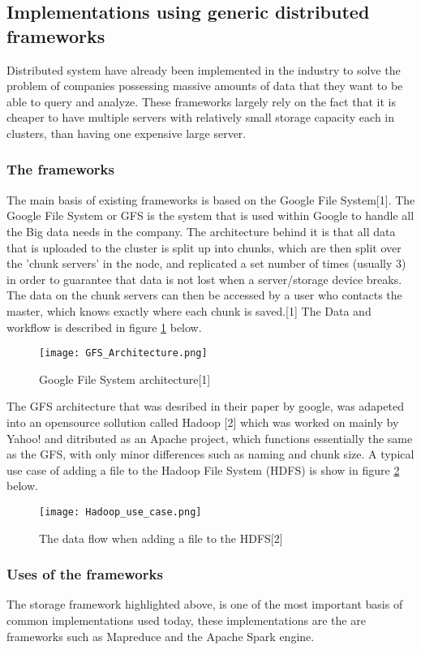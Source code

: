 \subsection{Implementations using generic distributed frameworks}
Distributed system have already been implemented in the industry to solve the
problem of companies possessing massive amounts of data that they want to be able
to query and analyze. These frameworks largely rely on the fact that it is cheaper
to have multiple servers with relatively small storage capacity each in clusters,
than having one expensive large server.

\subsubsection{The frameworks}
The main basis of existing frameworks is based on the Google File System[1]. The
Google File System or GFS is the system that is used within Google to handle all
the Big data needs in the company. The architecture behind it is that all data that
is uploaded to the cluster is split up into chunks, which are then split over the
'chunk servers' in the node, and replicated a set number of times (usually 3) in
order to guarantee that data is not lost when a server/storage device breaks. The
data on the chunk servers can then be accessed by a user who contacts the master,
which knows exactly where each chunk is saved.[1] The Data and workflow is described
in figure \ref{GFS_Architecture} below.

\begin{figure}
  \texttt{[image: GFS\_Architecture.png]}
  \caption{Google File System architecture[1]}
  \label{GFS_Architecture}
\end{figure}

The GFS architecture that was desribed in their paper by google, was adapeted into
an opensource sollution called Hadoop [2] which was worked on mainly by Yahoo! and
ditributed as an Apache project, which functions essentially the same as the GFS,
with only minor differences such as naming and chunk size. A typical use case of
adding a file to the Hadoop File System (HDFS) is show in figure \ref{Hadoop_usecase}
below.

\begin{figure}
  \texttt{[image: Hadoop\_use\_case.png]}
  \caption{The data flow when adding a file to the HDFS[2]}
  \label{Hadoop_usecase}
\end{figure}

\subsubsection{Uses of the frameworks}
The storage framework highlighted above, is one of the most important basis of common implementations used today,
these implementations are the are frameworks such as Mapreduce and the Apache Spark engine.

